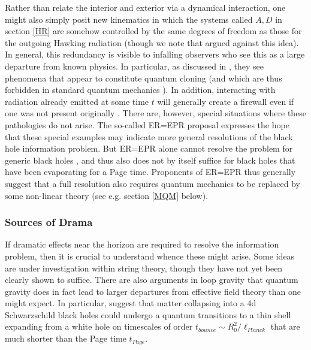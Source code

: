 \documentclass[12pt]{article}
\begin{document}
Rather than relate the interior and exterior via a dynamical interaction, one might also simply posit new kinematics in which the systems called $A,D$ in section \ref{HR} are somehow controlled by the same degrees of freedom as those for the outgoing Hawking radiation \cite{Bousso:2012as,Nomura:2012sw,Papadodimas:2012aq,Nomura:2012cx,Harlow:2013tf,Susskind:2013tg}  (though we note that \cite{Bousso:2012as} argued against this idea). In general, this redundancy is visible to infalling observers who see this as a large departure from known physics.  In particular, as discussed in \cite{Almheiri:2013hfa}, they see phenomena that appear to constitute quantum cloning (and which are thus forbidden in standard quantum mechanics \cite{Wootters:1982zz,Dieks:1982dj}).  In addition, interacting with radiation already emitted at some time $t$ will generally create a firewall even if one was not present originally \cite{Almheiri:2013hfa,Bousso:2013wia,Bousso:2013ifa}.  There are, however, special situations \cite{Maldacena:2013xja} where these pathologies do not arise.   The so-called ER=EPR proposal expresses the hope that these special examples may indicate more general resolutions of the black hole information problem.   But ER=EPR alone cannot resolve the problem for generic black holes \cite{BoussoTalk,Marolf:2013dba,Bousso:2013wia,Bousso:2013ifa}, and thus also does not by itself suffice for black holes that have been evaporating for a Page time.  Proponents of ER=EPR thus generally suggest \cite{Susskind:2014moa} that a full resolution also requires quantum mechanics to be replaced by some non-linear theory (see e.g. section \ref{MQM} below).



\subsubsection{Sources of Drama}

If dramatic effects near the horizon are required to resolve the information problem, then it is crucial to understand whence these might arise.  Some ideas \cite{Giveon:2012kp,Silverstein:2014yza} are under investigation within string theory, though they have not yet been clearly shown to suffice.    There are also arguments in loop gravity that quantum gravity does in fact lead to larger departures from effective field theory than one might expect.  In particular, \cite{Rovelli:2014cta,Haggard:2014rza,Christodoulou:2016vny} suggest that matter collapsing into a 4d Schwarzschild black holes could undergo a quantum transitions to a thin shell expanding from a white hole on timescales of order $t_{bounce} \sim R_0^2/\ell_{Planck}$ that are much shorter than the Page time $t_{Page}$.
\end{document}
